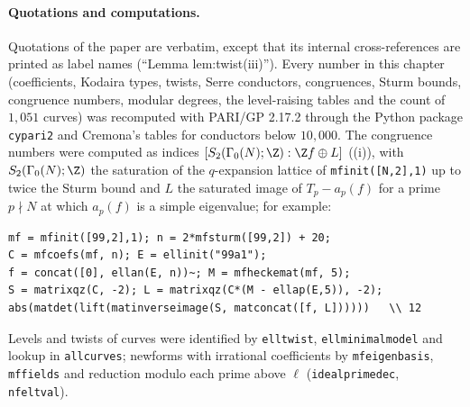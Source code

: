 \paragraph{Quotations and computations.} Quotations of the paper are verbatim, except that its internal cross-references are
printed as label names (``Lemma lem:twist(iii)''). Every number in this chapter (coefficients, Kodaira types, twists, Serre conductors, congruences, Sturm bounds,
congruence numbers, modular degrees, the level-raising tables and the count of $1{,}051$ curves) was recomputed with PARI/GP 2.17.2 \cite{PARI} through the Python package
\texttt{cypari2} and Cremona's tables \cite{Cremona97} for conductors below $10{,}000$. The congruence numbers were computed as indices $[S_2(\Gamma_0(N);\Z):\Z f\oplus L]$
((i)), with $S_2(\Gamma_0(N);\Z)$ the saturation of the $q$-expansion lattice of \texttt{mfinit([N,2],1)} up to twice the Sturm bound and $L$ the saturated
image of $T_p-a_p(f)$ for a prime $p\nmid N$ at which $a_p(f)$ is a simple eigenvalue; for example:
\begin{lstlisting}[language=GP]
mf = mfinit([99,2],1); n = 2*mfsturm([99,2]) + 20;
C = mfcoefs(mf, n); E = ellinit("99a1");
f = concat([0], ellan(E, n))~; M = mfheckemat(mf, 5);
S = matrixqz(C, -2); L = matrixqz(C*(M - ellap(E,5)), -2);
abs(matdet(lift(matinverseimage(S, matconcat([f, L])))))   \\ 12
\end{lstlisting}
Levels and twists of curves were identified by \texttt{elltwist}, \texttt{ellminimalmodel} and lookup in \texttt{allcurves}; newforms with irrational coefficients by
\texttt{mfeigenbasis}, \texttt{mffields} and reduction modulo each prime above $\ell$ (\texttt{idealprimedec}, \texttt{nfeltval}).
